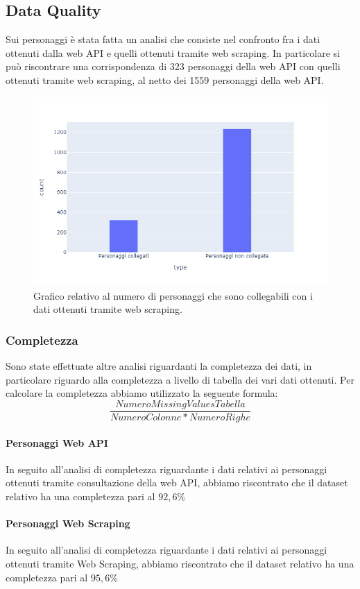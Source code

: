 \documentclass[
12pt, %
a4paper, %
oneside, %
headinclude,footinclude, %
BCOR5mm, %
]{scrartcl}
\begin{document}
\subsection{Data Quality}
Sui personaggi è stata fatta un analisi che consiste nel confronto fra i dati ottenuti dalla web API e quelli ottenuti tramite web scraping. In particolare si può riscontrare una corrispondenza di 323 personaggi della web API con quelli ottenuti tramite web scraping, al netto dei 1559 personaggi della web API.
\begin{figure}[H]
  \includegraphics[scale=0.5]{./Figures/plot_corrispondenza_personaggi.png}
  \caption{Grafico relativo al numero di personaggi che sono collegabili con i dati ottenuti tramite web scraping.}
\end{figure}
\subsubsection{Completezza}
Sono state effettuate altre analisi riguardanti la completezza dei dati, in particolare riguardo alla completezza a livello di tabella dei vari dati ottenuti. Per calcolare la completezza abbiamo utilizzato la seguente formula:
\[\frac{Numero Missing ValuesTabella}{Numero Colonne * Numero Righe}\]
\paragraph{Personaggi Web API}
In seguito all'analisi di completezza riguardante i dati relativi ai personaggi ottenuti tramite consultazione della web API, abbiamo riscontrato che il dataset relativo ha una completezza pari al $92,6 \%$
\paragraph{Personaggi Web Scraping}
In seguito all'analisi di completezza riguardante i dati relativi ai personaggi ottenuti tramite Web Scraping, abbiamo riscontrato che il dataset relativo ha una completezza pari al $95,6 \%$
\end{document}
